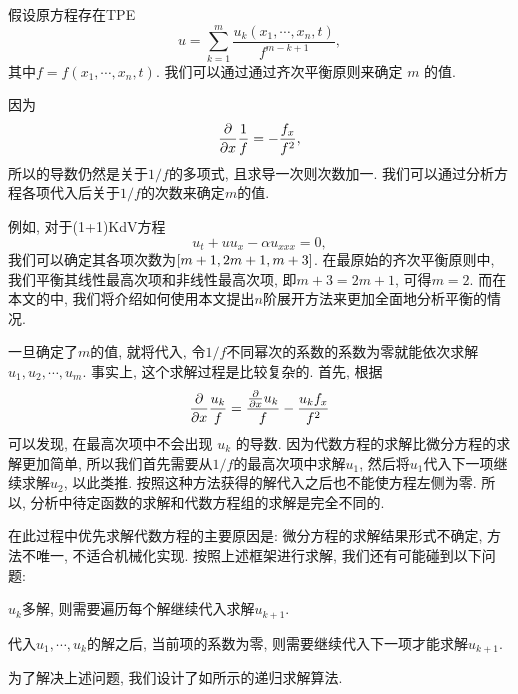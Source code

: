 假设原方程存在TPE
\begin{equation}
    u=\sum_{k=1}^{m}{\frac{u_k(x_1,\cdots,x_n,t)}{f^{m-k+1}}},  \label{tr}
\end{equation}
其中$f=f(x_1,\cdots,x_n,t)$. 我们可以通过通过齐次平衡原则来确定 $m$ 的值. 

因为
\begin{equation}
    \frac{\partial}{\partial x}\frac{1}{f}=-\frac{f_x}{f^2},
\end{equation}
所以的导数仍然是关于$1/f$的多项式, 且求导一次则次数加一. 我们可以通过分析方程各项代入后关于$1/f$的次数来确定$m$的值.

例如, 对于(1+1)KdV方程\CITEaaKdV{}
\begin{equation}
    u_t+uu_x-\alpha u_{xxx}=0,
\end{equation}
我们可以确定其各项次数为$\left[m+1,2m+1,m+3\right]$. 在最原始的齐次平衡原则中, 我们平衡其线性最高次项和非线性最高次项, 即$m+3=2m+1$, 可得$m=2$. 而在本文的中, 我们将介绍如何使用本文提出$n$阶展开方法来更加全面地分析平衡的情况. 

一旦确定了$m$的值, 就将代入, 令$1/f$不同幂次的系数的系数为零就能依次求解$u_1,u_2,\cdots,u_m$. 事实上, 这个求解过程是比较复杂的. 首先, 根据 
\begin{equation}
    \frac{\partial}{\partial x}\frac{u_k}{f}=\frac{\frac{\partial}{\partial x}u_k}{f}-\frac{u_kf_x}{f^2}
\end{equation} 
可以发现, 在最高次项中不会出现 $u_k$ 的导数. 因为代数方程的求解比微分方程的求解更加简单, 所以我们首先需要从$1/f$的最高次项中求解$u_1$, 然后将$u_1$代入下一项继续求解$u_2$, 以此类推. 按照这种方法获得的解代入之后也不能使方程左侧为零. 所以, \Painleve{}分析中待定函数的求解和代数方程组的求解是完全不同的.

在此过程中优先求解代数方程的主要原因是: 微分方程的求解结果形式不确定, 方法不唯一, 不适合机械化实现. 按照上述框架进行求解, 我们还有可能碰到以下问题: 
\begin{compactenum}[(1)]
\item $u_k$多解, 则需要遍历每个解继续代入求解$u_{k+1}$.
\item 代入$u_1,\cdots,u_k$的解之后, 当前项的系数为零, 则需要继续代入下一项才能求解$u_{k+1}$. 
\end{compactenum}
为了解决上述问题, 我们设计了如所示的递归求解算法. 

